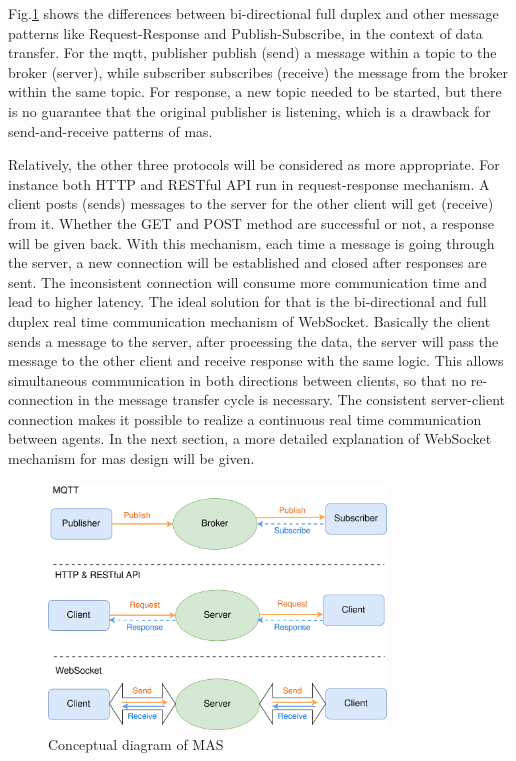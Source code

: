 Fig.\ref{fig: MsgConceptual} shows the differences between bi-directional full duplex and other message patterns like Request-Response and Publish-Subscribe, in the context of data transfer. 
For the \gls{mqtt}, publisher publish (send) a message within a topic to the broker (server), while subscriber subscribes (receive) the message from the broker within the same topic. 
For response, a new topic needed to be started, but there is no guarantee that the original publisher is listening, which is a drawback for send-and-receive patterns of \gls{mas}. 

Relatively, the other three protocols will be considered as more appropriate. 
For instance both HTTP and RESTful API run in request-response mechanism. 
A client posts (sends) messages to the server for the other client will get (receive) from it. 
Whether the GET and POST method are successful or not, a response will be given back. With this mechanism, each time a message is going through the server, a new connection will be established and closed after responses are sent. 
The inconsistent connection will consume more communication time and lead to higher latency. 
The ideal solution for that is the bi-directional and full duplex real time communication mechanism of WebSocket. 
Basically the client sends a message to the server, after processing the data, the server will pass the message to the other client and receive response with the same logic. This allows simultaneous communication in both directions between clients, so that no re-connection in the message transfer cycle is necessary. The consistent server-client connection makes it possible to realize a continuous real time communication between agents. In the next section, a more detailed explanation of WebSocket mechanism for \gls{mas} design will be given.

\begin{figure}[htb]
\includegraphics[width=0.8\textwidth]{figures/MessageConceptual.png}
\centering
\caption{Conceptual diagram of MAS\label{fig: MsgConceptual}}
\end{figure}


